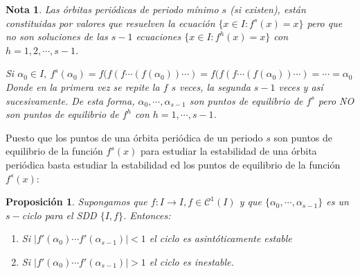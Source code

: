 \documentclass[11pt, a4paper]{article}
\newif\IfInSansMode
\numberwithin{equation}{section}
\theoremstyle{theorem-style}
\newtheorem{nprop}{Proposición}[section]
\theoremstyle{definition-style}
\theoremstyle{remark-style}
\newtheorem*{nota}{Nota}
\theoremstyle{example-style}
\newenvironment{nlist}
{\begin{enumerate}
    \renewcommand\labelenumi{(\emph{\roman{enumi})}}}
  {\end{enumerate}}
\begin{document}
\begin{nota}
	Las órbitas periódicas de periodo mínimo $s$ (si existen), están constituidas por valores que resuelven la ecuación $\{x \in I : f^s(x) = x\}$ pero que no son soluciones de las $s-1$ ecuaciones $\{x \in I : f^h(x) = x\}$ con $h=1,2,\cdots, s-1$.
	
	
	Si $\alpha_0 \in I, \ f^s(\alpha_0)= f(f(f\cdots(f(\alpha_0))\cdots)= f(f(f\cdots(f(\alpha_0))\cdots) =  \cdots = \alpha_0$
	Donde en la primera vez se repite la $f$ $s$ veces, la segunda $s-1$ veces y así sucesivamente. De esta forma, $\alpha_0,\cdots,\alpha_{s-1}$ son puntos  de equilibrio de $f^s$ pero NO son puntos de equilibrio de $f^h$ con $h = 1,\cdots, s-1$.
\end{nota}


Puesto que los puntos de una órbita periódica de un periodo $s$ son puntos de equilibrio de la función $f^s(x)$ para estudiar la estabilidad de una órbita periódica basta estudiar la estabilidad ed los puntos de equilibrio de la función $f^s(x)$:
\begin{nprop}
	Supongamos que $f:I \to I, f \in \mathcal{C}^1(I)$ y que $\{\alpha_0,\cdots, \alpha_{s-1}\}$ es un $s-$ciclo para el SDD $\{I,f\}$. Entonces:
	\begin{nlist}
	\item Si $|f'(\alpha_0)\cdots f'(\alpha_{s-1})|<1$ el ciclo es asintóticamente estable
	\item Si $|f'(\alpha_0)\cdots f'(\alpha_{s-1})|>1$ el ciclo es inestable.
\end{nlist}
\end{nprop}
\end{document}
